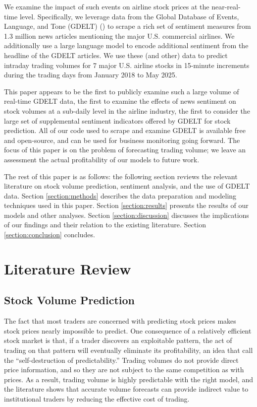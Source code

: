 \documentclass[12pt]{article}
\begin{document}
We examine the impact of such events on airline stock prices at the near-real-time level. Specifically, we leverage data from the Global Database of Events, Language, and Tone (GDELT) (\textcite{leetaru2013gdelt}) to scrape a rich set of sentiment measures from 1.3 million news articles mentioning the major U.S. commercial airlines. We additionally use a large language model to encode additional sentiment from the headline of the GDELT articles. We use these (and other) data to predict intraday trading volumes for 7 major U.S. airline stocks in 15-minute increments during the trading days from January 2018 to May 2025.

This paper appears to be the first to publicly examine such a large volume of real-time GDELT data, the first to examine the effects of news sentiment on stock volumes at a sub-daily level in the airline industry, the first to consider the large set of supplemental sentiment indicators offered by GDELT for stock prediction. All of our code used to scrape and examine GDELT is available free and open-source, and can be used for business monitoring going forward. The focus of this paper is on the problem of forecasting trading volume; we leave an assessment the actual profitability of our models to future work.

The rest of this paper is as follows: the following section reviews the relevant literature on stock volume prediction, sentiment analysis, and the use of GDELT data. Section \ref{section:methods} describes the data preparation and modeling techniques used in this paper. Section \ref{section:results} presents the results of our models and other analyses. Section \ref{section:discussion} discusses the implications of our findings and their relation to the existing literature. Section \ref{section:conclusion} concludes.

\section{Literature Review}
\label{section:litreview}

\subsection{Stock Volume Prediction}
The fact that most traders are concerned with predicting stock prices makes stock prices nearly impossible to predict. One consequence of a relatively efficient stock market is that, if a trader discovers an exploitable pattern, the act of trading on that pattern will eventually eliminate its profitability, an idea that \textcite{timmermann2004efficient} call the ``self-destruction of predictability.'' Trading volumes do not provide direct price information, and so they are not subject to the same competition as with prices. As a result, trading volume is highly predictable with the right model, and the literature shows that accurate volume forecasts can provide indirect value to institutional traders by reducing the effective cost of trading.
\end{document}
